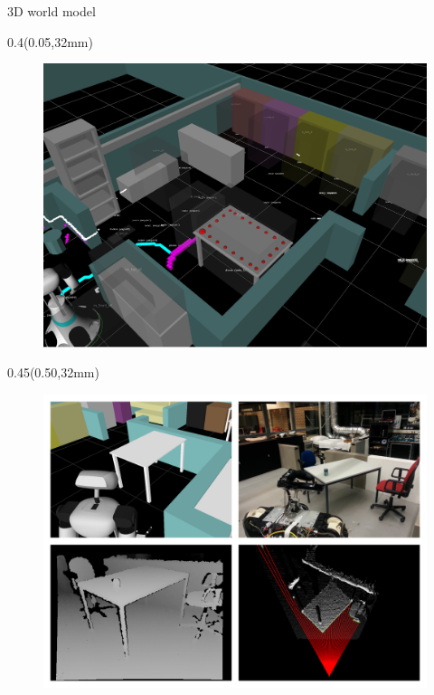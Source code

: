 \documentclass[aspectratio=43]{beamer}
\newcommand{\TULeftMargin}{0.05\paperwidth}
\newcommand{\TULeftWidth}{0.4\paperwidth}
\newcommand{\TURightMargin}{0.50\paperwidth}
\newcommand{\TURightWidth}{0.45\paperwidth}
\begin{document}
	\begin{frame}
	
    3D world model

		\begin{textblock*}{\TULeftWidth}(\TULeftMargin,32mm)
			\begin{figure}
				\centering
				\includegraphics[width=1.1\linewidth]{../[TechUnitedStyle]/Figures/WorldModel}
			\end{figure}
		\end{textblock*}
		
	\begin{textblock*}{\TURightWidth}(\TURightMargin,32mm)
            \begin{figure}
				\centering
				\includegraphics[width=1.1\linewidth]{../[TechUnitedStyle]/Figures/Perception}
			\end{figure}
	\end{textblock*}	
	
	\end{frame}
\end{document}
